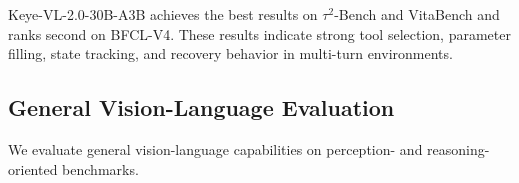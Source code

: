 \documentclass{llmxive}
\providecommand{\arraystretch}{1.15}
\begin{document}
\begin{table}[t]
\centering
\setlength{\tabcolsep}{3pt}
\renewcommand{\arraystretch}{1.15}
\caption{Tool-use and function-calling evaluation of Keye-VL-2.0-30B-A3B against representative baselines. \textbf{Bold} marks the best result per row, \underline{underline} marks the second-best, and ``--'' indicates an unavailable comparable score.}
\label{tab:tool_use_eval}
\end{table}

Keye-VL-2.0-30B-A3B achieves the best results on $\tau^2$-Bench and VitaBench and ranks second on BFCL-V4. These results indicate strong tool selection, parameter filling, state tracking, and recovery behavior in multi-turn environments.

\subsection{General Vision-Language Evaluation}

We evaluate general vision-language capabilities on perception- and reasoning-oriented benchmarks.
\end{document}
